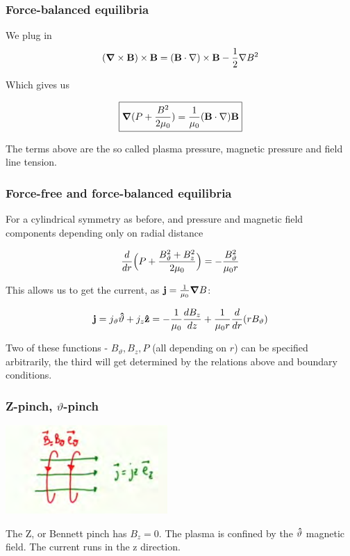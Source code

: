 \documentclass[PlasmaNotes.tex]{subfiles}
\begin{document}
\subsubsection{Force-balanced equilibria}

We plug in
\[\mathbf{(\mbox{\boldmath$ \nabla $} \times \mathbf{B})} \times \mathbf{B} = \mathbf{(\mathbf{B} \cdot \mathbf{\nabla})} \times \mathbf{B} - \frac{1}{2} \nabla B^2 \]

Which gives us

\begin{equation}
\boxed{ \mbox{\boldmath$ \nabla $} (P + \frac{B^2}{2\mu_0}) = \frac{1}{\mu_0} (\mathbf{B} \cdot \mathbf{\nabla}) \mathbf{B} }
\end{equation}

The terms above are the so called plasma pressure, magnetic pressure and field line tension.

\subsubsection{Force-free and force-balanced equilibria}

For a cylindrical symmetry as before, and pressure and magnetic field components depending only on radial distance

\[ \frac{d }{d r} \Big(P + \frac{B_{\vartheta}^2+B_z^2}{2\mu_0}\Big) = - \frac{B_{\vartheta}^2}{\mu_0 r} \]

This allows us to get the current, as $\mathbf{j} = \frac{1}{\mu_0} \mbox{\boldmath$ \nabla $} B$:

\[\mathbf{j} = j_{\vartheta} \mathbf{\hat{\vartheta}} + j_z \mathbf{\hat{z}} = -\frac{1}{\mu_0} \frac{d B_z}{d z} + \frac{1}{\mu_0 r} \frac{d }{d r}(r B_{\vartheta}) \]

Two of these functions - $B_{\vartheta}, B_z, P$ (all depending on $r$) can be specified arbitrarily, the third will get determined by the relations above and boundary conditions. 

\subsubsection{Z-pinch, $\vartheta$-pinch}

\includegraphics{zpinch}

The Z, or Bennett pinch has $B_z=0$. The plasma is confined by the $\mathbf{\hat{\vartheta}}$ magnetic field. The current runs in the z direction.
\end{document}
